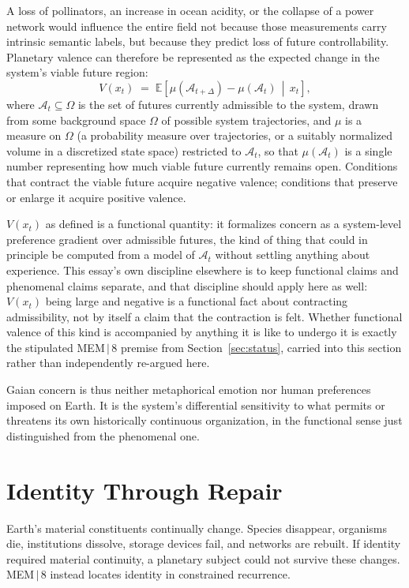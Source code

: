 \documentclass[11pt]{article}
\begin{document}
A loss of pollinators, an increase in ocean acidity, or the collapse of a power network would influence the entire field not because those measurements carry intrinsic semantic labels, but because they predict loss of future controllability. Planetary valence can therefore be represented as the expected change in the system's viable future region:
\[
V(x_t) \;=\; \mathbb{E}\!\left[ \mu(\mathcal{A}_{t+\Delta}) - \mu(\mathcal{A}_t) \,\middle|\, x_t \right],
\]
where $\mathcal{A}_t\subseteq\Omega$ is the set of futures currently admissible to the system, drawn from some background space $\Omega$ of possible system trajectories, and $\mu$ is a measure on $\Omega$ (a probability measure over trajectories, or a suitably normalized volume in a discretized state space) restricted to $\mathcal{A}_t$, so that $\mu(\mathcal{A}_t)$ is a single number representing how much viable future currently remains open. Conditions that contract the viable future acquire negative valence; conditions that preserve or enlarge it acquire positive valence.

$V(x_t)$ as defined is a functional quantity: it formalizes concern as a system-level preference gradient over admissible futures, the kind of thing that could in principle be computed from a model of $\mathcal{A}_t$ without settling anything about experience. This essay's own discipline elsewhere is to keep functional claims and phenomenal claims separate, and that discipline should apply here as well: $V(x_t)$ being large and negative is a functional fact about contracting admissibility, not by itself a claim that the contraction is felt. Whether functional valence of this kind is accompanied by anything it is like to undergo it is exactly the stipulated MEM\,$|$\,8 premise from Section~\ref{sec:status}, carried into this section rather than independently re-argued here.

Gaian concern is thus neither metaphorical emotion nor human preferences imposed on Earth. It is the system's differential sensitivity to what permits or threatens its own historically continuous organization, in the functional sense just distinguished from the phenomenal one.

\section{Identity Through Repair}
\label{sec:identity-repair}

Earth's material constituents continually change. Species disappear, organisms die, institutions dissolve, storage devices fail, and networks are rebuilt. If identity required material continuity, a planetary subject could not survive these changes. MEM\,$|$\,8 instead locates identity in constrained recurrence.
\end{document}
